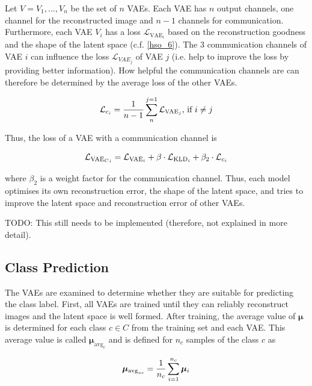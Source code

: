 Let $V = {V_1, ..., V_n}$ be the set of $n$ VAEs. Each VAE has $n$ output channels, one channel for the reconstructed image and $n-1$ channels for communication. Furthermore, each VAE $V_i$ has a loss $\mathcal{L}_{\text{VAE}_i}$ based on the reconstruction goodness and the shape of the latent space (c.f. \eqref{hso_6}). The $3$ communication channels of VAE $i$ can influence the loss $\mathcal{L}_{VAE_j}$ of VAE $j$ (i.e. help to improve the loss by providing better information). How helpful the communication channels are can therefore be determined by the average loss of the other VAEs.

\begin{equation}\eqlbl{hso_9}
	\mathcal{L}_{c_i} = \frac{1}{n-1} \sum_{n}^{j=1} \mathcal{L}_{\text{VAE}_j} \text{, if } i \neq j
\end{equation}

Thus, the loss of a VAE with a communication channel is

\begin{equation}\eqlbl{hso_10}
		\mathcal{L}_{{\text{VAE}_C}_i} = \mathcal{L}_{\text{VAE}_i} + \beta \cdot \mathcal{L}_{\text{KLD}_i} + \beta_2 \cdot \mathcal{L}_{c_i}
\end{equation}

where $\beta_2$ is a weight factor for the communication channel. Thus, each model optimises its own reconstruction error, the shape of the latent space, and tries to improve the latent space and reconstruction error of other VAEs.


TODO: This still needs to be implemented (therefore, not explained in more detail).

\subsection{Class Prediction}
The VAEs are examined to determine whether they are suitable for predicting the class label. First, all VAEs are trained until they can reliably reconstruct images and the latent space is well formed.
After training, the average value of $\boldsymbol{\mu}$ is determined for each class $c \in C$ from the training set and each VAE. This average value is called $\boldsymbol{\mu}_{\text{avg}_c}$ and is defined for $n_c$ samples of the class $c$ as

\begin{equation}\eqlbl{hso_12}
		\boldsymbol{\mu}_{\text{avg}_{vc}} = \frac{1}{n_c} \sum_{i=1}^{n_c} \boldsymbol{\mu}_i
\end{equation}

